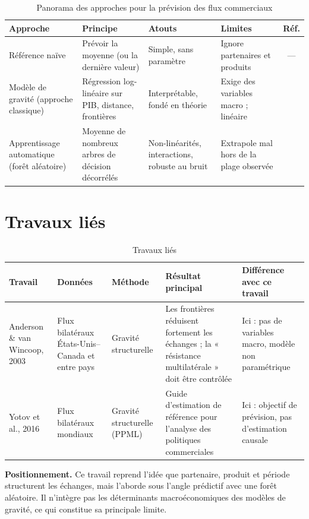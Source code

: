\documentclass[11pt,a4paper]{article}
\begin{document}
\begin{table}[H]\centering\small
\caption{Panorama des approches pour la prévision des flux commerciaux}
\begin{tabularx}{\textwidth}{@{}p{2.6cm}XXXc@{}}
\toprule
Approche & Principe & Atouts & Limites & Réf.\\\midrule
Référence naïve & Prévoir la moyenne (ou la dernière valeur) & Simple, sans paramètre & Ignore partenaires et produits & ---\\
Modèle de gravité (approche classique) & Régression log-linéaire sur PIB, distance, frontières & Interprétable, fondé en théorie & Exige des variables macro ; linéaire & \cite{tinbergen,anderson}\\
Apprentissage automatique (forêt aléatoire) & Moyenne de nombreux arbres de décision décorrélés & Non-linéarités, interactions, robuste au bruit & Extrapole mal hors de la plage observée & \cite{breiman}\\
\bottomrule
\end{tabularx}
\end{table}

\section{Travaux liés}\label{sec:liés}
\begin{table}[H]\centering\small
\caption{Travaux liés}
\begin{tabularx}{\textwidth}{@{}p{2.6cm}p{2.3cm}p{2.3cm}XX@{}}
\toprule
Travail & Données & Méthode & Résultat principal & Différence avec ce travail\\\midrule
Anderson \& van Wincoop, 2003 \cite{anderson} & Flux bilatéraux États-Unis--Canada et entre pays & Gravité structurelle & Les frontières réduisent fortement les échanges ; la « résistance multilatérale » doit être contrôlée & Ici : pas de variables macro, modèle non paramétrique\\
Yotov et al., 2016 \cite{yotov} & Flux bilatéraux mondiaux & Gravité structurelle (PPML) & Guide d'estimation de référence pour l'analyse des politiques commerciales & Ici : objectif de prévision, pas d'estimation causale\\
\bottomrule
\end{tabularx}
\end{table}

\textbf{Positionnement.} Ce travail reprend l'idée que partenaire, produit et période structurent les échanges, mais l'aborde sous l'angle prédictif avec une forêt aléatoire. Il n'intègre pas les déterminants macroéconomiques des modèles de gravité, ce qui constitue sa principale limite.
\end{document}
